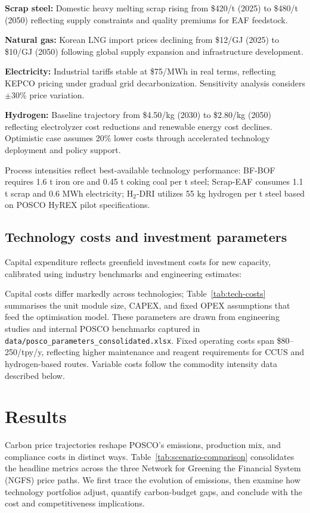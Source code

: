 \documentclass[preprint,1p,authoryear]{elsarticle}
\begin{document}
\textbf{Scrap steel:} Domestic heavy melting scrap rising from \$420/t (2025) to \$480/t (2050) reflecting supply constraints and quality premiums for EAF feedstock.

\textbf{Natural gas:} Korean LNG import prices declining from \$12/GJ (2025) to \$10/GJ (2050) following global supply expansion and infrastructure development.

\textbf{Electricity:} Industrial tariffs stable at \$75/MWh in real terms, reflecting KEPCO pricing under gradual grid decarbonization. Sensitivity analysis considers $\pm$30\% price variation.

\textbf{Hydrogen:} Baseline trajectory from \$4.50/kg (2030) to \$2.80/kg (2050) reflecting electrolyzer cost reductions and renewable energy cost declines. Optimistic case assumes 20\% lower costs through accelerated technology deployment and policy support.

Process intensities reflect best-available technology performance: BF-BOF requires 1.6 t iron ore and 0.45 t coking coal per t steel; Scrap-EAF consumes 1.1 t scrap and 0.6 MWh electricity; H$_2$-DRI utilizes 55 kg hydrogen per t steel based on POSCO HyREX pilot specifications.

\subsection{Technology costs and investment parameters}

Capital expenditure reflects greenfield investment costs for new capacity, calibrated using industry benchmarks and engineering estimates:

Capital costs differ markedly across technologies; Table~\ref{tab:tech-costs} summarises the unit module size, CAPEX, and fixed OPEX assumptions that feed the optimisation model. These parameters are drawn from engineering studies and internal POSCO benchmarks captured in \texttt{data/posco\_parameters\_consolidated.xlsx}. Fixed operating costs span \$80--250/tpy/y, reflecting higher maintenance and reagent requirements for CCUS and hydrogen-based routes. Variable costs follow the commodity intensity data described below.




\section{Results}

Carbon price trajectories reshape POSCO's emissions, production mix, and compliance costs in distinct ways. Table~\ref{tab:scenario-comparison} consolidates the headline metrics across the three Network for Greening the Financial System (NGFS) price paths. We first trace the evolution of emissions, then examine how technology portfolios adjust, quantify carbon-budget gaps, and conclude with the cost and competitiveness implications.
\end{document}
